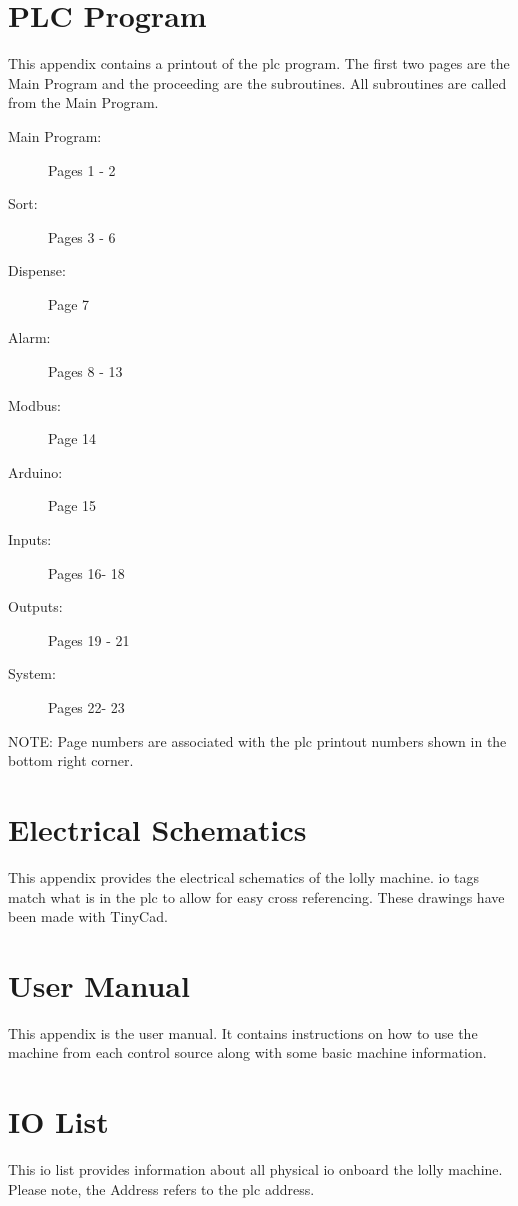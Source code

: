 \appendix

\chapter{PLC Program}  \label{app:plcProg}
    This appendix contains a printout of the \acrshort{plc} program. The first two pages are the Main Program and the proceeding are the subroutines. All subroutines are called from the Main Program.

    \begin{description}
        \item[Main Program:] Pages 1 - 2
        \item[Sort:] Pages 3 - 6
        \item[Dispense:] Page 7
        \item[Alarm:] Pages 8 - 13
        \item[Modbus:] Page 14
        \item[Arduino:] Page 15
        \item[Inputs:] Pages 16- 18
        \item[Outputs:] Pages 19 - 21
        \item[System:] Pages 22- 23
    \end{description}

    NOTE: Page numbers are associated with the \acrshort{plc} printout numbers shown in the bottom right corner. 
    
     
    
\chapter{Electrical Schematics} \label{app:elecSch}
    This appendix provides the electrical schematics of the lolly machine. \acrshort{io} tags match what is in the \acrshort{plc} to allow for easy cross referencing. These drawings have been made with TinyCad.
    

\chapter{User Manual} \label{app:userGuide}
    This appendix is the user manual. It contains instructions on how to use the machine from each control source along with some basic machine information.
    

\chapter{IO List} \label{app:ioList}
    This \acrshort{io} list provides information about all physical \acrshort{io} onboard the lolly machine. Please note, the Address refers to the \acrshort{plc} address.
    

